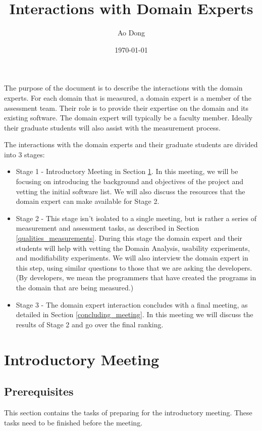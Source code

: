 \documentclass[12pt]{article}
\title{Interactions with Domain Experts}
\author{Ao Dong}
\date{\today}
\begin{document}
\maketitle

The purpose of the document is to describe the interactions with the domain
experts.  For each domain that is measured, a domain expert is a member of the
assessment team.  Their role is to provide their expertise on the domain and its
existing software.   The domain expert will typically be a faculty member.
Ideally their graduate students will also assist with the measurement process.

The interactions with the domain experts and their graduate students are divided
into 3 stages:

\begin{itemize}
\item Stage 1 - Introductory Meeting in Section \ref{introductory_meeting}. In
this meeting, we will be focusing on introducing the background and objectives
of the project and vetting the initial software list.  We will also discuss the
resources that the domain expert can make available for Stage 2.
\item Stage 2 - This stage isn't isolated to a single meeting, but is rather a
  series of measurement and assessment tasks, as described in Section
  \ref{qualities_measurements}.  During this stage the domain expert and their
  students will help with vetting the Domain Analysis, usability
  experiments, and modifiability experiments.  We will also interview the domain
  expert in this step, using similar questions to those that we are asking the
  developers.  (By developers, we mean the programmers that have created the
  programs in the domain that are being measured.)
\item Stage 3 - The domain expert interaction concludes with a final meeting, as
  detailed in Section \ref{concluding_meeting}.  In this meeting we will discuss
  the results of Stage 2 and go over the final ranking.
\end{itemize}

\section{Introductory Meeting}
\label{introductory_meeting}

\subsection{Prerequisites}
This section contains the tasks of preparing for the introductory meeting. These
tasks need to be finished before the meeting.
\end{document}
